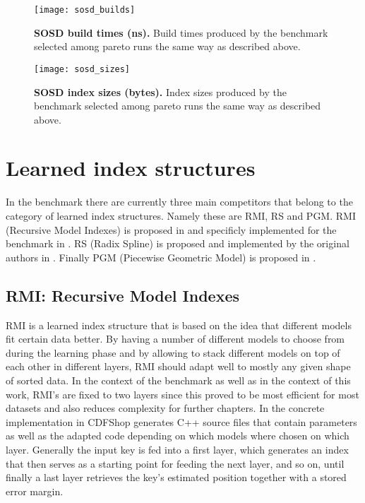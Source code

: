 \begin{figure}[ht]
\centering
\texttt{[image: sosd\_builds]}
\caption[SOSD Build Times]{
  \textbf{SOSD build times (ns).}
  Build times produced by the benchmark selected among pareto runs the same way as described above.
}
\label{fig:sosd_builds}
\end{figure}

\begin{figure}[ht]
\centering
\texttt{[image: sosd\_sizes]}
\caption[SOSD index sizes]{
  \textbf{SOSD index sizes (bytes).}
  Index sizes produced by the benchmark selected among pareto runs the same way as described above.
}
\label{fig:sosd_sizes}
\end{figure}

\section{Learned index structures}
In the benchmark there are currently three main competitors that belong to the category of learned index structures. Namely these are RMI, RS and PGM. RMI (Recursive Model Indexes) is proposed in \cite{rmi} and specificly implemented for the benchmark in \cite{cdfshop}. RS (Radix Spline) is proposed and implemented by the original authors in \cite{radixspline}. Finally PGM (Piecewise Geometric Model) is proposed in \cite{pgm}.

\subsection{RMI: Recursive Model Indexes}
\label{sect:background:rmi}
RMI \cite{rmi} is a learned index structure that is based on the idea that different models fit certain data better. By having a number of different models to choose from during the learning phase and by allowing to stack different models on top of each other in different layers, RMI should adapt well to mostly any given shape of sorted data. In the context of the benchmark as well as in the context of this work, RMI's are fixed to two layers since this proved to be most efficient for most datasets and also reduces complexity for further chapters. In the concrete implementation in \cite{cdfshop} CDFShop generates C++ source files that contain parameters as well as the adapted code depending on which models where chosen on which layer. Generally the input key is fed into a first layer, which generates an index that then serves as a starting point for feeding the next layer, and so on, until finally a last layer retrieves the key's estimated position together with a stored error margin.\\

